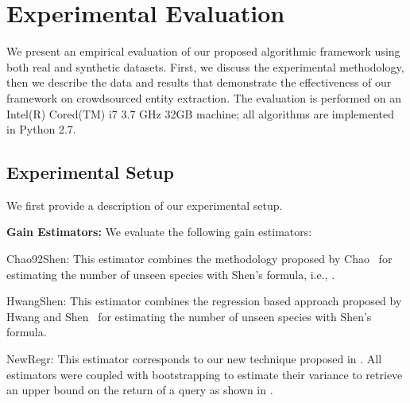 

\section{Experimental Evaluation}
\label{sec:exps}
We present an empirical evaluation of our proposed algorithmic framework using both real and synthetic datasets. First, we discuss the experimental methodology, then we describe the data and results that demonstrate the effectiveness of our framework on crowdsourced entity extraction. The evaluation is performed on an Intel(R) Cored(TM) i7 3.7 GHz 32GB machine; all algorithms are implemented in Python 2.7. 

\subsection{Experimental Setup}
\label{sec:expsetup}
We first provide a description of our experimental setup.

\vspace{2pt}\noindent\textbf{Gain Estimators:} We evaluate the following gain estimators:
\squishlist
\item Chao92Shen: This estimator combines the methodology proposed by Chao~\cite{chao:1992} for estimating the number of unseen species  with Shen's formula, i.e., .
\item HwangShen: This estimator combines the regression based approach proposed by Hwang and Shen~\cite{hwang:2010} for estimating the number of unseen species with Shen's formula. 
\item NewRegr: This estimator corresponds to our new technique proposed in .
\squishend
All estimators were coupled with bootstrapping to estimate their variance to retrieve an upper bound on the return of a query as shown in .

